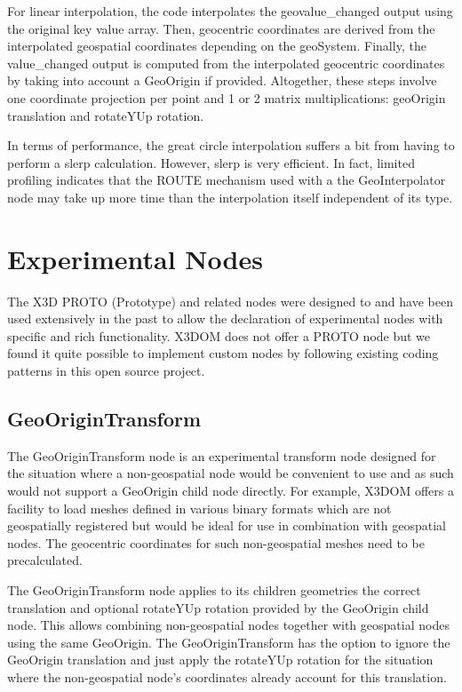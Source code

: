 \documentclass[review]{acmsiggraph}            %
\begin{document}
For linear interpolation, the code interpolates the geovalue\_changed output using the original key
value array. Then, geocentric coordinates are derived from the interpolated geospatial coordinates
depending on the geoSystem. Finally, the  value\_changed output is computed from the interpolated
geocentric coordinates by taking into account a GeoOrigin if provided. Altogether, these steps
involve one coordinate projection per point and 1 or 2 matrix multiplications: geoOrigin translation
and rotateYUp rotation.

In terms of performance, the great circle interpolation suffers a bit from having to perform a slerp
calculation. However, slerp is very efficient. In fact, limited profiling indicates that the ROUTE
mechanism used with a the GeoInterpolator node may take up more time than the interpolation itself
independent of its type.

\section{Experimental Nodes}

The X3D PROTO (Prototype) and related nodes were designed to and have been used extensively in the past to allow the declaration of experimental nodes with specific and rich functionality. X3DOM does not offer a PROTO node but we found it quite possible to implement custom nodes by following existing coding patterns in this open source project.

\subsection{GeoOriginTransform}

The GeoOriginTransform node is an experimental transform node designed for the situation where 
a non-geospatial node would be convenient to use and as such would not support a GeoOrigin child 
node directly. For example, X3DOM offers a facility to load meshes defined in various binary 
formats which are not geospatially registered but would be ideal for use in combination with 
geospatial nodes. The geocentric coordinates for such non-geospatial meshes need to be 
precalculated.

The GeoOriginTransform node applies to its children geometries the correct translation and 
optional rotateYUp rotation provided by the GeoOrigin child node. This allows combining 
non-geospatial nodes together with geospatial nodes using the same GeoOrigin. The GeoOriginTransform has 
the option to ignore the GeoOrigin translation and just apply the rotateYUp rotation for the 
situation where the non-geospatial node's coordinates already account for this translation.
\end{document}
